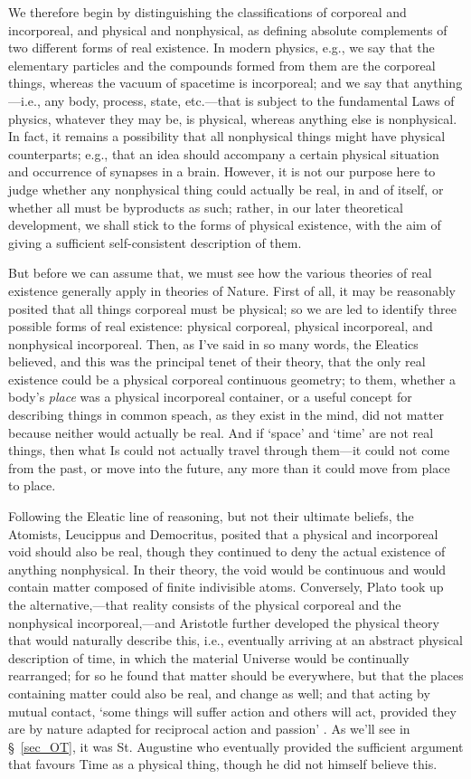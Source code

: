 We therefore begin by distinguishing the classifications of corporeal and incorporeal, and physical and nonphysical, as defining absolute complements of two different forms of real existence. In modern physics, e.g., we say that the elementary particles and the compounds formed from them are the corporeal things, whereas the vacuum of spacetime is incorporeal; and we say that anything---i.e., any body, process, state, etc.---that is subject to the fundamental Laws of physics, whatever they may be, is physical, whereas anything else is nonphysical. In fact, it remains a possibility that all nonphysical things might have physical counterparts; e.g., that an idea should accompany a certain physical situation and occurrence of synapses in a brain. However, it is not our purpose here to judge whether any nonphysical thing could actually be real, in and of itself, or whether all must be byproducts as such; rather, in our later theoretical development, we shall stick to the forms of physical existence, with the aim of giving a sufficient self-consistent description of them. 

But before we can assume that, we must see how the various theories of real existence generally apply in theories of Nature. First of all, it may be reasonably posited that all things corporeal must be physical; so we are led to identify three possible forms of real existence: physical corporeal, physical incorporeal, and nonphysical incorporeal. Then, as I've said in so many words, the Eleatics believed, and this was the principal tenet of their theory, that the only real existence could be a physical corporeal continuous geometry; to them, whether a body's \textit{place} was a physical incorporeal container, or a useful concept for describing things in common speach, as they exist in the mind, did not matter because neither would actually be real. And if `space' and `time' are not real things, then what Is could not actually travel through them---it could not come from the past, or move into the future, any more than it could move from place to place. 

Following the Eleatic line of reasoning, but not their ultimate beliefs, the Atomists, Leucippus and Democritus, posited that a physical and incorporeal void should also be real, though they continued to deny the actual existence of anything nonphysical. In their theory, the void would be continuous and would contain matter composed of finite indivisible atoms. Conversely, Plato took up the alternative,---that reality consists of the physical corporeal and the nonphysical incorporeal,---and Aristotle further developed the physical theory that would naturally describe this, i.e., eventually arriving at an abstract physical description of time, in which the material Universe would be continually rearranged; for so he found that matter should be everywhere, but that the places containing matter could also be real, and change as well; and that acting by mutual contact, `some things will suffer action and others will act, provided they are by nature adapted for reciprocal action and passion' \cite{Aristotle1984}. As we'll see in \S~\ref{sec_OT}, it was St. Augustine who eventually provided the sufficient argument that favours Time as a physical thing, though he did not himself believe this.

